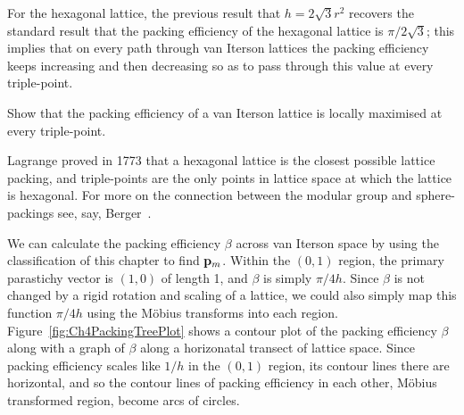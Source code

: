 For the hexagonal lattice, the previous result that $h= 2\sqrt{3} r^2$ 
recovers the standard result that the packing efficiency of the hexagonal lattice is $\pi/2\sqrt{3}$; this implies that on every path through van Iterson lattices the packing efficiency keeps increasing and then decreasing so as to pass through this value at every triple-point.  
\begin{jExercise}
Show that the packing efficiency of a van Iterson lattice is locally maximised at every triple-point.
\end{jExercise}
\begin{jAnswer}
	Lagrange proved in 1773 that a hexagonal lattice is the closest possible lattice packing, and triple-points are the only points in lattice space at which the lattice is hexagonal. For more on the connection between the modular group and sphere-packings see, say, Berger~\cite{bergerGeometryRevealedJacob2010}.
\end{jAnswer}
We can calculate the packing efficiency $\beta$ across van Iterson space by using the classification of this chapter to find ${\mathbf p}_{m}$.  Within the $(0,1)$ region, the primary parastichy vector is $(1,0)$ of length 1, and $\beta$ is simply $\pi/ {4 h }$.  Since $\beta$ is not changed by a rigid rotation and scaling of a lattice, we could also simply map this function  $\pi/ {4 h }$ using the M{\"o}bius transforms into each region. Figure~\ref{fig:Ch4PackingTreePlot} shows a contour plot of the packing efficiency $\beta$ along with a graph of $\beta$ along a horizonatal transect of lattice space.
%
Since packing efficiency scales like $1/h$ in the $(0,1)$ region, its contour lines there are horizontal, and so the contour lines of packing efficiency in each other, M{\"o}bius transformed region, become arcs of circles. 
\clearpage
